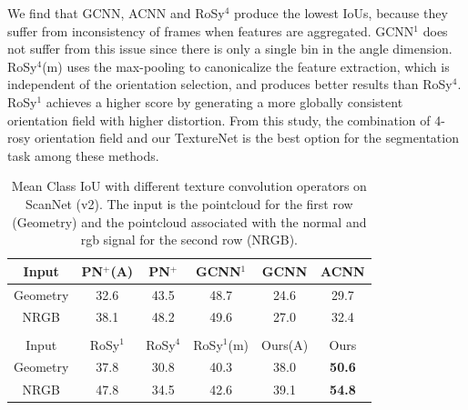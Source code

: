 We find that GCNN, ACNN and RoSy$^4$ produce the lowest IoUs, because they suffer from inconsistency of frames when features are aggregated.  GCNN$^1$ does not suffer from this issue since there is only a single bin in the angle dimension. RoSy$^4$(m) uses the max-pooling to canonicalize the feature extraction, which is independent of the orientation selection, and produces better results than RoSy$^4$. RoSy$^1$ achieves a higher score by generating a more globally consistent orientation field with higher distortion. From this study, the combination of 4-rosy orientation field and our TextureNet is the best option for the segmentation task among these methods.  %

\begin{table}
    \centering
    \tabcolsep=0.03cm
    \begin{tabular}{|c|c|c|c|c|c|}
        \hline
         Input & PN$^+$(A) & PN$^+$ & GCNN$^1$ & GCNN & ACNN\\
         \hline
         Geometry & 32.6 & 43.5 & 48.7 & 24.6 & 29.7\\
         \hline
         NRGB & 38.1 & 48.2 & 49.6 & 27.0 & 32.4\\
         \hline
         \multicolumn{6}{c}{}\\
         \hline
         Input &  RoSy$^1$ & RoSy$^4$ & RoSy$^1$(m) & Ours(A) & Ours\\
         \hline
         Geometry & 37.8 & 30.8 & 40.3 & 38.0 & \textbf{50.6}\\
         \hline
         NRGB & 47.8 & 34.5 & 42.6 & 39.1 & \textbf{54.8}\\
         \hline
    \end{tabular}
    \caption{Mean Class IoU with different texture convolution operators on ScanNet (v2). The input is the pointcloud for the first row (Geometry) and the pointcloud associated with the normal and rgb signal for the second row (NRGB).}
    \label{tab:texturenet-operator}
\end{table}



